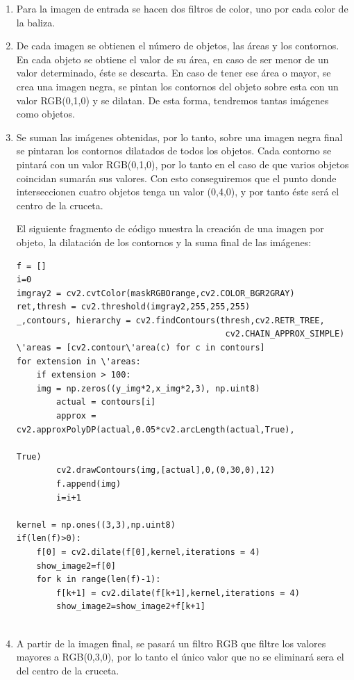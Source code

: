\begin{enumerate}
	\item Para la imagen de entrada se hacen dos filtros de color, uno por cada color de la baliza.
	\item De cada imagen se obtienen el n\'umero de objetos, las \'areas y los contornos. En cada objeto se obtiene el valor de su \'area, en caso de ser menor de un valor determinado, \'este se descarta. En caso de tener ese \'area o mayor, se crea una imagen negra, se pintan los contornos del objeto sobre esta con un valor RGB(0,1,0) y se dilatan. De esta forma, tendremos tantas im\'agenes como objetos. 
	\item Se suman las im\'agenes obtenidas, por lo tanto, sobre una imagen negra final se pintaran los contornos dilatados de todos los objetos. Cada contorno se pintar\'a con un valor RGB(0,1,0), por lo tanto en el caso de que varios objetos coincidan sumar\'an sus valores. Con esto conseguiremos que el punto donde interseccionen cuatro objetos tenga un valor (0,4,0), y por tanto \'este ser\'a el centro de la cruceta.
	
\hspace{1 cm}El siguiente fragmento de c\'odigo muestra la creaci\'on de una imagen por objeto, la dilataci\'on de los contornos y la suma final de las im\'agenes:

\begin{lstlisting}[backgroundcolor=\color{yellow}]
f = []
i=0
imgray2 = cv2.cvtColor(maskRGBOrange,cv2.COLOR_BGR2GRAY)
ret,thresh = cv2.threshold(imgray2,255,255,255)
_,contours, hierarchy = cv2.findContours(thresh,cv2.RETR_TREE,
                                          cv2.CHAIN_APPROX_SIMPLE)
\'areas = [cv2.contour\'area(c) for c in contours]
for extension in \'areas:
    if extension > 100:
    img = np.zeros((y_img*2,x_img*2,3), np.uint8)
        actual = contours[i]
        approx = cv2.approxPolyDP(actual,0.05*cv2.arcLength(actual,True),
                                                                       True)
        cv2.drawContours(img,[actual],0,(0,30,0),12)
        f.append(img)
        i=i+1
			
kernel = np.ones((3,3),np.uint8)
if(len(f)>0):
    f[0] = cv2.dilate(f[0],kernel,iterations = 4)
    show_image2=f[0]
    for k in range(len(f)-1):
        f[k+1] = cv2.dilate(f[k+1],kernel,iterations = 4)
        show_image2=show_image2+f[k+1]
		
\end{lstlisting}


	\item A partir de la imagen final, se pasar\'a un filtro RGB que filtre los valores mayores a RGB(0,3,0), por lo tanto el \'unico valor que no se eliminar\'a sera el del centro de la cruceta.


\end{enumerate}
